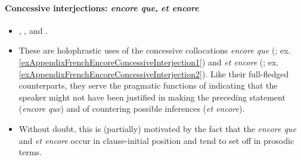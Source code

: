 \paragraph{Concessive interjections: \textit{encore que}, \textit{et encore}}\label{appendixFrenchEncoreConcessiveInterjections}
\begin{itemize}
	\sloppy
	\item  \textcite[s.v. \textit{encore}]{Dicctionnaire}, \textcite{Deloor2012}, \textcite[192–193]{MosegaardHansen2008} and \textcite{VictorriFuchs1996}.
	\item These are holophrastic uses of the concessive collocations \textit{encore que} (; ex. \ref{exAppendixFrenchEncoreConcessiveInterjection1}) and  \textit{et encore} (; ex. \ref{exAppendixFrenchEncoreConcessiveInterjection2}). Like their full-fledged counterparts, they serve the pragmatic functions of indicating that the speaker might not have been justified in making the preceding statement (\textit{encore que}) and of countering possible inferences (\textit{et encore}).
	\item Without doubt, this is (partially) motivated by the fact that the \textit{encore que} and \textit{et encore} occur in clause-initial position and tend to set off in prosodic terms.
\end{itemize}
\largerpage
